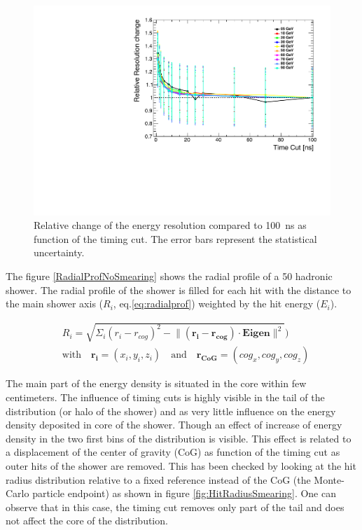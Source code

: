 \begin{figure}[t]
  \centering
  \includegraphics[width=0.5\linewidth]{chap6/fig_TimingILD/NoSmearing/ShowerReso_TimeCuts_noSmearing}
  \caption{Relative change of the energy resolution compared to \SI{100}{\nano\second} as function of the timing cut. The error bars represent the statistical uncertainty.} \label{fig:resoRelativeNoSmearing}
\end{figure}

The figure \ref{RadialProfNoSmearing} shows the radial profile of a 50 \GeV hadronic shower. The radial profile of the shower is filled for each hit with the distance to the main shower axis ($R_{i}$, eq.\ref{eq:radialprof})  weighted by the hit energy ($E_{i}$).

\begin{equation} \label{eq:radialprof}
  \begin{split}
    & R_{i} = \sqrt{\Sigma_{i} (r_{i} - r_{cog})^{2} - \lVert (\mathbf{r_{i}} - \mathbf{r_{cog}}) \cdot \mathbf{Eigen} \rVert^{2}}) \\
    & \text{with} \quad \mathbf{r_{i}} = (x_i, y_i, z_i) \quad \text{and} \quad \mathbf{r_{CoG}} = (cog_x, cog_y, cog_z)
  \end{split}
\end{equation}

The main part of the energy density is situated in the core within few centimeters. The influence of timing cuts is highly visible in the tail of the distribution (or halo of the shower) and as very little influence on the energy density deposited in core of the shower. Though an effect of increase of energy density in the two first bins of the distribution is visible. This effect is related to a displacement of the center of gravity (CoG) as function of the timing cut as outer hits of the shower are removed. This has been checked by looking at the hit radius distribution relative to a fixed reference instead of the CoG (the Monte-Carlo particle endpoint) as shown in figure \ref{fig:HitRadiusSmearing}. One can observe that in this case, the timing cut removes only part of the tail and does not affect the core of the distribution.

